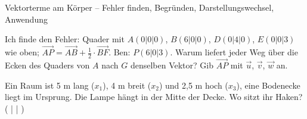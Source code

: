 \begin{aufgabe}{Vektorterme am Körper – Fehler finden, Begründen, Darstellungswechsel, Anwendung}
\begin{teile}
\teil Ich finde den Fehler: Quader mit $A(0 | 0 | 0)$, $B(6 | 0 | 0)$, $D(0 | 4 | 0)$, $E(0 | 0 | 3)$ wie oben; $\overrightarrow{AP} = \overrightarrow{AB} + \frac{1}{2} \cdot \overrightarrow{BF}$. Ben: $P(6 | 0 | 3)$.
\teil Warum liefert jeder Weg über die Ecken des Quaders von $A$ nach $G$ denselben Vektor?
\teil Gib $\overrightarrow{AP}$ mit $\vec u$, $\vec v$, $\vec w$ an.

\begin{ksys3}[x1max=7]              \end{ksys3}
\teil Ein Raum ist 5 m lang ($x_1$), 4 m breit ($x_2$) und 2,5 m hoch ($x_3$), eine Bodenecke liegt im Ursprung. Die Lampe hängt in der Mitte der Decke. Wo sitzt ihr Haken? ( \leerfeld | \leerfeld | \leerfeld )
\end{teile}
\end{aufgabe}
